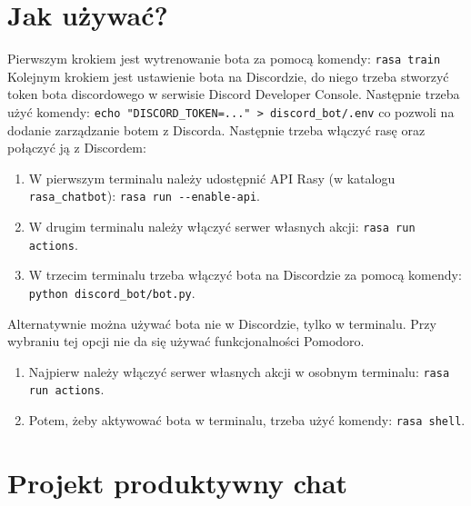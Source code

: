 \documentclass{article}
\begin{document}
\section{Jak używać?}
Pierwszym krokiem jest wytrenowanie bota za pomocą komendy:
\verb|rasa train|
Kolejnym krokiem jest ustawienie bota na Discordzie, do niego trzeba stworzyć
token bota discordowego w serwisie Discord Developer Console. Następnie trzeba
użyć komendy:
\verb|echo "DISCORD_TOKEN=..." > discord_bot/.env|
co pozwoli na dodanie zarządzanie botem z Discorda.
Następnie trzeba włączyć rasę oraz połączyć ją z Discordem:
\begin{enumerate}
    \item[\textcolor{violet}{\textbullet}] W pierwszym terminalu należy udostępnić API Rasy (w katalogu \verb|rasa_chatbot|): 
        \verb|rasa run --enable-api|.
    \item[\textcolor{violet}{\textbullet}] W drugim terminalu należy włączyć serwer własnych akcji:
        \verb|rasa run actions|.
    \item[\textcolor{violet}{\textbullet}] W trzecim terminalu trzeba włączyć bota na Discordzie za pomocą
        komendy: \verb|python discord_bot/bot.py|.
\end{enumerate}
Alternatywnie można używać bota nie w Discordzie, tylko w terminalu. Przy
wybraniu tej opcji nie da się używać funkcjonalności Pomodoro.
\begin{enumerate}
    \item[\textcolor{violet}{\textbullet}] Najpierw należy włączyć serwer własnych akcji w osobnym terminalu:
        \verb|rasa run actions|.
    \item[\textcolor{violet}{\textbullet}] Potem, żeby aktywować bota w terminalu, trzeba użyć komendy: 
        \verb|rasa shell|.
\end{enumerate}
\section{Projekt produktywny chat}
\end{document}
